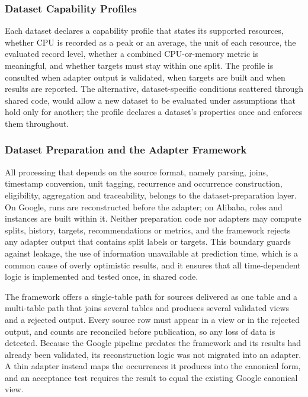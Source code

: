 \documentclass{IEEEtran}
\begin{document}
\subsubsection{Dataset Capability Profiles}\label{sec:4.1.2}

Each dataset declares a capability profile that states its supported resources, whether CPU is recorded as a peak or an average, the unit of each resource, the evaluated record level, whether a combined CPU-or-memory metric is meaningful, and whether targets must stay within one split. The profile is consulted when adapter output is validated, when targets are built and when results are reported. The alternative, dataset-specific conditions scattered through shared code, would allow a new dataset to be evaluated under assumptions that hold only for another; the profile declares a dataset's properties once and enforces them throughout.

\subsubsection{Dataset Preparation and the Adapter Framework}\label{sec:4.1.3}

All processing that depends on the source format, namely parsing, joins, timestamp conversion, unit tagging, recurrence and occurrence construction, eligibility, aggregation and traceability, belongs to the dataset-preparation layer. On Google, runs are reconstructed before the adapter; on Alibaba, roles and instances are built within it. Neither preparation code nor adapters may compute splits, history, targets, recommendations or metrics, and the framework rejects any adapter output that contains split labels or targets. This boundary guards against leakage, the use of information unavailable at prediction time, which is a common cause of overly optimistic results, and it ensures that all time-dependent logic is implemented and tested once, in shared code.

The framework offers a single-table path for sources delivered as one table and a multi-table path that joins several tables and produces several validated views and a rejected output. Every source row must appear in a view or in the rejected output, and counts are reconciled before publication, so any loss of data is detected. Because the Google pipeline predates the framework and its results had already been validated, its reconstruction logic was not migrated into an adapter. A thin adapter instead maps the occurrences it produces into the canonical form, and an acceptance test requires the result to equal the existing Google canonical view.
\end{document}
